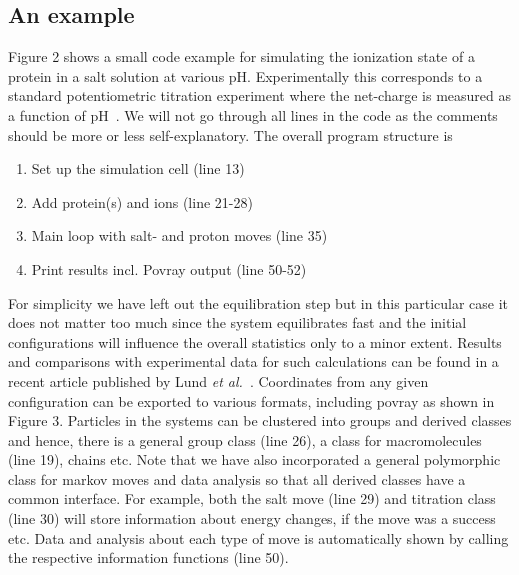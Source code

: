 \documentclass[10pt]{bmc_article}
\newenvironment{bmcformat}{\fussy\setboolean{publ}{true}}{\fussy}
\begin{document}
\begin{bmcformat}
\subsection*{An example}
Figure 2 shows a small code example for simulating the ionization state of a protein in a salt solution at various pH. Experimentally this corresponds to a standard potentiometric titration experiment where the net-charge is measured as a function of pH~\cite{tanford:72}. We will not go through all lines in the code as the comments should be more or less self-explanatory. The overall program structure is
\begin{enumerate}
\item Set up the simulation cell (line 13)
\item Add protein(s) and ions (line 21-28)
\item Main loop with salt- and proton moves (line 35)
\item Print results incl. Povray output (line 50-52)
\end{enumerate}
For simplicity we have left out the equilibration step but in this particular case it does not matter too much since the system equilibrates fast and the initial configurations will influence the overall statistics only to a minor extent.
Results and comparisons with experimental data for such calculations can be found in a recent article published by Lund \emph{et al.}~\cite{lund:07}.
Coordinates from any given configuration can be exported to various formats, including povray as shown in Figure 3.
Particles in the systems can be clustered into groups and derived classes and hence, there is a general group class (line 26), a class for macromolecules (line 19), chains etc. Note that we have also incorporated a general polymorphic class for markov moves and data analysis so that all derived classes have a common interface. For example, both the salt move (line 29) and titration class (line 30) will store information about energy changes, if the move was a success etc. Data and analysis about each type of move is automatically shown by calling the respective information functions (line 50).





\end{bmcformat}
\end{document}
